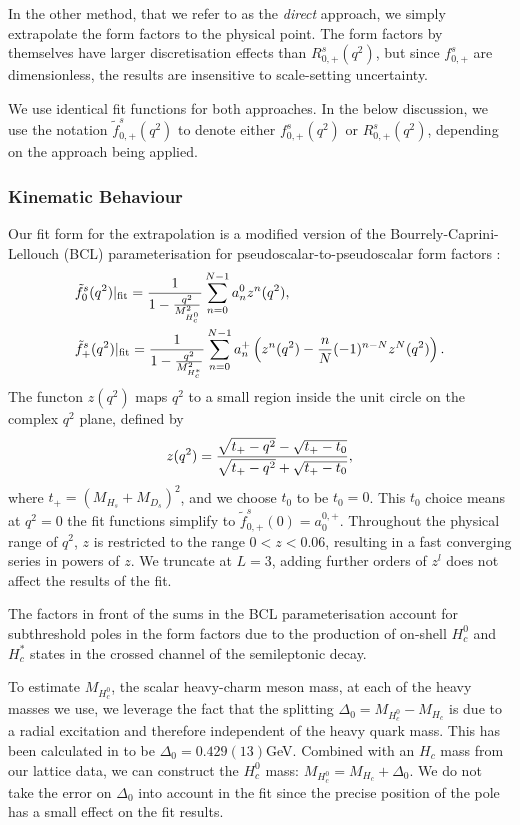 In the other method, that we refer to as the {\textit{direct}} approach, we simply extrapolate the form factors to the physical point. The form factors by themselves have larger discretisation effects than $R_{0,+}^s(q^2)$, but since $f^s_{0,+}$ are dimensionless, the results are insensitive to scale-setting uncertainty.

We use identical fit functions for both approaches. In the below discussion, we use the notation $\tilde{f}^s_{0,+}(q^2)$ to denote either $f^s_{0,+}(q^2)$ or $R_{0,+}^s(q^2)$, depending on the approach being applied.

\subsubsection{Kinematic Behaviour}

Our fit form for the extrapolation is a modified version of the Bourrely-Caprini-Lellouch (BCL) parameterisation for pseudoscalar-to-pseudoscalar form factors \cite{Bourrely:2008za}:
\begin{align}
  \label{eq:BCL}
  &\tilde{f}^s_0(q^2)|_{\text{fit}} = {1\over 1 - {q^2\over M_{H_c^0}^2} } \sum_{n=0}^{N-1} a_n^0 z^n(q^2), \\
  &\tilde{f}^s_+(q^2)|_{\text{fit}} = {1\over 1 - {q^2\over M_{H_c^*}^2} } \sum_{n=0}^{N-1} a_n^+ \left( z^n(q^2) - {n\over N} (-1)^{n-N} z^N(q^2) \right). \nonumber
\end{align}
The functon $z(q^2)$ maps $q^2$ to a small region inside the unit circle on the complex $q^2$ plane, defined by
\begin{align}
  z(q^2) = {\sqrt{t_+ - q^2} - \sqrt{t_+ - t_0} \over \sqrt{t_+ - q^2} + \sqrt{t_+ - t_0} },
\end{align}
where $t_+ = (M_{H_s}+M_{D_s})^2$, and we choose $t_0$ to be $t_0 = 0$. This $t_0$ choice means at $q^2=0$ the fit functions simplify to $\tilde{f}_{0,+}^s(0) = a_0^{0,+}$. Throughout the physical range of $q^2$, $z$ is restricted to the range $0<z<0.06$, resulting in a fast converging series in powers of $z$. We truncate at $L=3$, adding further orders of $z^l$ does not affect the results of the fit.

The factors in front of the sums in the BCL parameterisation account for subthreshold poles in the form factors due to the production of on-shell $H_c^0$ and $H_c^*$ states in the crossed channel of the semileptonic decay.

To estimate $M_{H_c^0}$, the scalar heavy-charm meson mass, at each of the heavy masses we use, we leverage the fact that the splitting $\Delta_0 = M_{H_c^0} - M_{H_c}$ is due to a radial excitation and therefore independent of the heavy quark mass. This has been calculated in \cite{Dowdall:2012ab} to be $\Delta_0 = 0.429(13)$GeV. Combined with an $H_c$ mass from our lattice data, we can construct the $H_c^0$ mass: $M_{H_c^0} = M_{H_c} + \Delta_0$. We do not take the error on $\Delta_0$ into account in the fit since the precise position of the pole has a small effect on the fit results.

